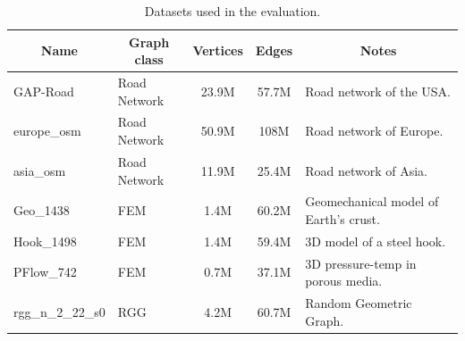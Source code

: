 \begin{table}[h]
    \centering
    \begin{tabularx}{\linewidth}{ l l c c l }
    \toprule
    \multicolumn{1}{c}{\textbf{Name}} & \multicolumn{1}{c}{\textbf{Graph class}} & \multicolumn{1}{c}{\textbf{Vertices}} &
    \multicolumn{1}{c}{\textbf{Edges}} & 
    \multicolumn{1}{c}{\textbf{Notes}}\\
    \midrule
    GAP-Road      & Road Network & 23.9M & 57.7M & Road network of the USA. \\
    europe\_osm   & Road Network & 50.9M & 108M  & Road network of Europe. \\
    asia\_osm     & Road Network & 11.9M & 25.4M & Road network of Asia. \\
    \addlinespace %
    Geo\_1438     & FEM          & 1.4M  & 60.2M & Geomechanical model of Earth's crust. \\
    Hook\_1498    & FEM          & 1.4M  & 59.4M & 3D model of a steel hook. \\
    PFlow\_742     & FEM          & 0.7M  & 37.1M & 3D pressure-temp in porous media. \\
    \addlinespace %
    rgg\_n\_2\_22\_s0 & RGG          & 4.2M  & 60.7M & Random Geometric Graph. \\
    \bottomrule
    \end{tabularx}
    \caption{Datasets used in the evaluation.}
    \label{tab:datasets_booktabs}
\end{table}



